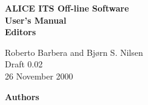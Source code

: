\documentclass{report}
\begin{document}
\begin{center}
\huge\bf ALICE ITS Off-line Software 
\\[0.25cm]
\huge\bf User's Manual
\\[1cm]
\normalsize
Editors

Roberto Barbera and Bj\o rn S. Nilsen
\\[1cm]
Draft 0.02\\
26 November 2000
\end{center}

\newpage

\noindent 
{\Large\bf{Authors}}
\\[0.25cm]


\tableofcontents












\begin{thebibliography}{99}

\end{thebibliography}
\end{document}

